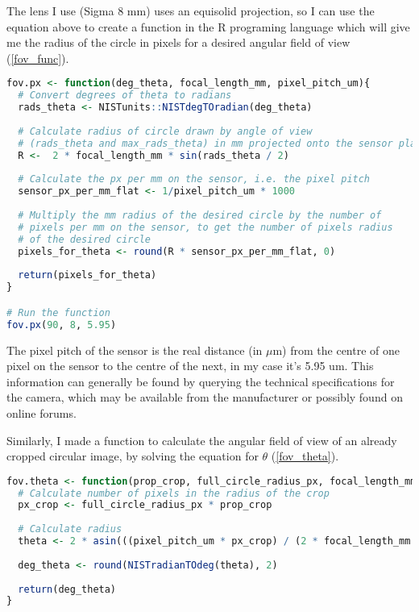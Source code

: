\documentclass{article}
\newcommand\file[1]{\texttt{\underline{#1}}}
\begin{document}
The lens I use (Sigma 8 mm) uses an equisolid projection, so I can use the equation above to create a function in the R programing language which will give me the radius of the circle in pixels for a desired angular field of view (\autoref{fov_func}).

\begin{minipage}{\linewidth}
\begin{lstlisting}[language=R, label=fov_func, caption=R function to calculate the pixel radius of a circle with a given zenith angle. Also found in \file{fov\_func.R} in the supplementary materials.]
fov.px <- function(deg_theta, focal_length_mm, pixel_pitch_um){
  # Convert degrees of theta to radians
  rads_theta <- NISTunits::NISTdegTOradian(deg_theta) 
  
  # Calculate radius of circle drawn by angle of view 
  # (rads_theta and max_rads_theta) in mm projected onto the sensor plane
  R <-  2 * focal_length_mm * sin(rads_theta / 2)
  
  # Calculate the px per mm on the sensor, i.e. the pixel pitch
  sensor_px_per_mm_flat <- 1/pixel_pitch_um * 1000
  
  # Multiply the mm radius of the desired circle by the number of 
  # pixels per mm on the sensor, to get the number of pixels radius 
  # of the desired circle
  pixels_for_theta <- round(R * sensor_px_per_mm_flat, 0)
  
  return(pixels_for_theta)
}

# Run the function
fov.px(90, 8, 5.95)
\end{lstlisting}
\end{minipage}

The pixel pitch of the sensor is the real distance (in $\mu$m) from the centre of one pixel on the sensor to the centre of the next, in my case it's 5.95 um. This information can generally be found by querying the technical specifications for the camera, which may be available from the manufacturer or possibly found on online forums.

Similarly, I made a function to calculate the angular field of view of an already cropped circular image, by solving the equation for $\theta$ (\autoref{fov_theta}). 

\begin{minipage}{\linewidth}
\begin{lstlisting}[language=R, label=fov_theta, caption=R function to calculate the zenith angle from a cropped circular image. Also found in \file{fov\_func.R} in the supplementary materials.]
fov.theta <- function(prop_crop, full_circle_radius_px, focal_length_mm, pixel_pitch_um){
  # Calculate number of pixels in the radius of the crop
  px_crop <- full_circle_radius_px * prop_crop
  
  # Calculate radius
  theta <- 2 * asin(((pixel_pitch_um * px_crop) / (2 * focal_length_mm * 1000)))
  
  deg_theta <- round(NISTradianTOdeg(theta), 2)
  
  return(deg_theta)
}
\end{lstlisting}
\end{minipage}
\end{document}
